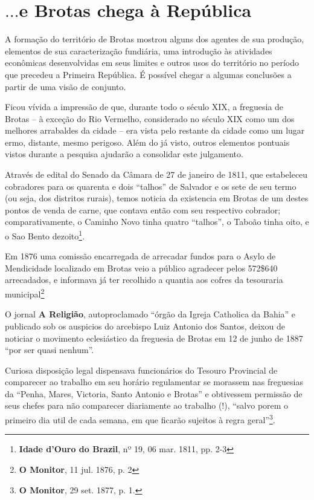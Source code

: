 \section{\(\dots\)e Brotas chega à República}\label{sec:conccap2}

A formação do território de Brotas mostrou alguns dos agentes de sua produção, elementos de sua caracterização fundiária, uma introdução às atividades econômicas desenvolvidas em seus limites e outros usos do território no período que precedeu a Primeira República. É possível chegar a algumas conclusões a partir de uma visão de conjunto.

Ficou vívida a impressão de que, durante todo o século XIX, a freguesia de Brotas -- à exceção do Rio Vermelho, considerado no século XIX como um dos melhores arrabaldes da cidade -- era vista pelo restante da cidade como um lugar ermo, distante, mesmo perigoso. Além do já visto, outros elementos pontuais vistos durante a pesquisa ajudarão a consolidar este julgamento.

Através de edital do Senado da Câmara de 27 de janeiro de 1811, que estabeleceu cobradores para os quarenta e dois ``talhos'' de Salvador e os sete de seu termo (ou seja, dos distritos rurais), temos noticia da existencia em Brotas de um destes pontos de venda de carne, que contava então com seu respectivo cobrador; comparativamente, o Caminho Novo tinha quatro ``talhos'', o Taboão tinha oito, e o Sao Bento dezoito\footnote{\textbf{Idade d'Ouro do Brazil}, nº 19, 06 mar. 1811, pp. 2-3}.

Em 1876 uma comissão encarregada de arrecadar fundos para o Asylo de Mendicidade localizado em Brotas veio a público agradecer pelos 572\$640 arrecadados, e informava já ter recolhido a quantia aos cofres da tesouraria municipal\footnote{\textbf{O Monitor}, 11 jul. 1876, p. 2}

O jornal \textbf{A Religião}, autoproclamado ``órgão da Igreja Catholica da Bahia'' e publicado sob os auspicios do arcebispo Luiz Antonio dos Santos, deixou de noticiar o movimento eclesiástico da freguesia de Brotas em 12 de junho de 1887 ``por ser quasi nenhum''.

Curiosa disposição legal dispensava funcionários do Tesouro Provincial de comparecer ao trabalho em seu horário regulamentar se morassem nas freguesias da ``Penha, Mares, Victoria, Santo Antonio e Brotas'' e obtivessem permissão de seus chefes para não comparecer diariamente ao trabalho (!), ``salvo porem o primeiro dia util de cada semana, em que ficarão sujeitos à regra geral''\footnote{\textbf{O Monitor}, 29 set. 1877, p. 1.}.

